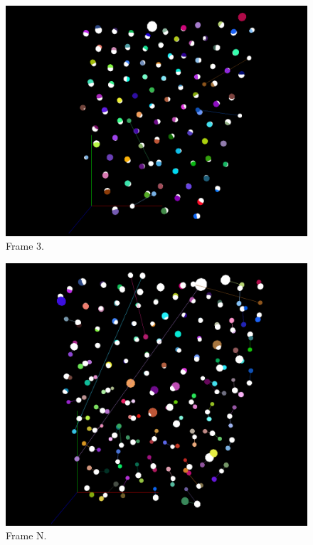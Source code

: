 \documentclass{article}
\begin{document}
\begin{figure}[!hbt]
	\centering
    \centerline{\includegraphics[width=40em]{images/f3.png}}
    \caption{Frame 3.}
    \label{fig:f3}
\end{figure}

\begin{figure}[!hbt]
	\centering
    \centerline{\includegraphics[width=40em]{images/f4.png}}
    \caption{Frame N.}
    \label{fig:fn}
\end{figure}
\end{document}
